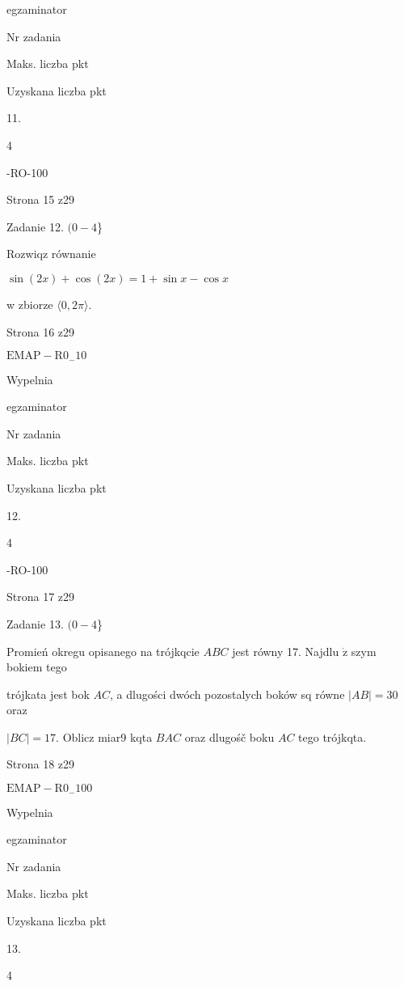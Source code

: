 \documentclass[a4paper,12pt]{article}
\begin{document}
egzaminator

Nr zadania

Maks. liczba pkt

Uzyskana liczba pkt

11.

4

-RO-100

Strona 15 z29





Zadanie 12. $(0-4$\}

Rozwiqz równanie

$\sin(2x)+\cos(2x)=1+\sin x-\cos x$

w zbiorze $\langle 0,2\pi\rangle.$

Strona 16 z29

$\mathrm{E}\mathrm{M}\mathrm{A}\mathrm{P}-\mathrm{R}0_{-}10$





Wypelnia

egzaminator

Nr zadania

Maks. liczba pkt

Uzyskana liczba pkt

12.

4

-RO-100

Strona 17 z29





Zadanie 13. $(0-4$\}

Promień okregu opisanego na trójkqcie $ABC$ jest równy 17. Najdlu $\dot{\mathrm{z}}$ szym bokiem tego

trójkata jest bok $AC$, a dlugości dwóch pozostalych boków sq równe $|AB|=30$ oraz

$|BC|=17$. Oblicz miar9 kqta $BAC$ oraz dlugośč boku $AC$ tego trójkqta.

Strona 18 z29

$\mathrm{E}\mathrm{M}\mathrm{A}\mathrm{P}-\mathrm{R}0_{-}100$





Wypelnia

egzaminator

Nr zadania

Maks. liczba pkt

Uzyskana liczba pkt

13.

4
\end{document}
